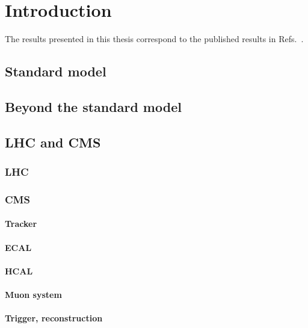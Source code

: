 \chapter{Introduction}

The results presented in this thesis correspond to the published results in Refs.~\cite{CMS:myTOPRun2,CMS:mySUSRun2PAS,CMS:myTOP2016,CMS:mySUS2016}.

\section{Standard model}


\section{Beyond the standard model}


\section{LHC and CMS}

\subsection{LHC}


\subsection{CMS}

\subsubsection{Tracker}

\subsubsection{ECAL}

\subsubsection{HCAL}

\subsubsection{Muon system}

\subsubsection{Trigger, reconstruction}
